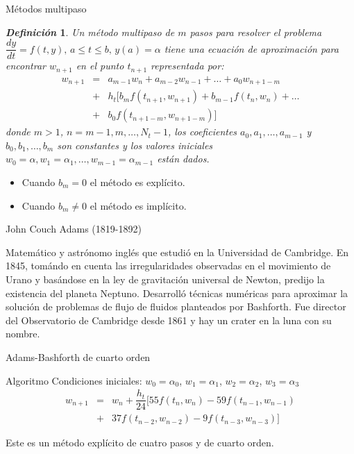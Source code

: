 \documentclass{beamer}
\newtheorem{defi}{\textit{\textbf{Definici\'on}}}
\begin{document}
\begin{frame}{Métodos multipaso}

{\small
\begin{defi}
Un método multipaso de $m$ pasos para resolver el problema
$\dfrac{dy}{dt} = f(t,y), \, a \leq t \leq b, \, y(a) = \alpha $ tiene una ecuación de aproximación para encontrar $w_{n+1}$ en el punto $t_{n+1}$ representada por:
\begin{eqnarray*}
w_{n+1} & = & a_{m-1} w_{n} + a_{m-2} w_{n-1} + \dots + a_{0} w_{n+1-m} \\
& + & h_t \big[b_{m} f(t_{n+1},w_{n+1}) + b_{m-1} f(t_{n},w_{n}) + \dots \\
& + & b_{0} f(t_{n+1-m},w_{n+1-m}) \big] 
\end{eqnarray*}
donde $m>1$, $n = m-1, m, \dots, N_t-1$, los coeficientes $a_0, a_1, \dots, a_{m-1}$ y $b_0, b_1, \dots, b_m$ son constantes y los valores iniciales $w_0 = \alpha, w_1 = \alpha_1, \dots, w_{m-1} = \alpha_{m-1}$ están dados.
\end{defi}

\begin{itemize}
	\item Cuando $b_m = 0$ el método es explícito.
	\item Cuando $b_m \neq 0$ el método es implícito.
\end{itemize}
}
\end{frame}

\begin{frame}{John Couch Adams (1819-1892)}

	
	 Matemático y astrónomo inglés que estudió en la Universidad de Cambridge. \pause En 1845, tomándo en cuenta las irregularidades observadas en el movimiento de Urano y basándose en la ley de gravitación universal de Newton, predijo la existencia del planeta Neptuno. \pause Desarrolló técnicas numéricas para aproximar la solución de problemas de flujo de fluidos planteados por Bashforth. \pause Fue director del Observatorio de Cambridge desde 1861 y hay un crater en la luna con su nombre.

\end{frame}

\begin{frame}{Adams-Bashforth de cuarto orden}

\begin{block}{Algoritmo}
Condiciones iniciales: $w_0 = \alpha_0$, $w_1 = \alpha_1$, $w_2 = \alpha_2$, $w_3 = \alpha_3$
\begin{eqnarray*}
w_{n+1} & = & w_n + \dfrac{h_t}{24}\big[ 55 f(t_n,w_n) - 59 f(t_{n-1},w_{n-1})  \\
& + & 37 f(t_{n-2},w_{n-2}) - 9 f(t_{n-3},w_{n-3})\big]
\end{eqnarray*}
\end{block}
Este es un método explícito de cuatro pasos y de cuarto orden.
\end{frame}
\end{document}
